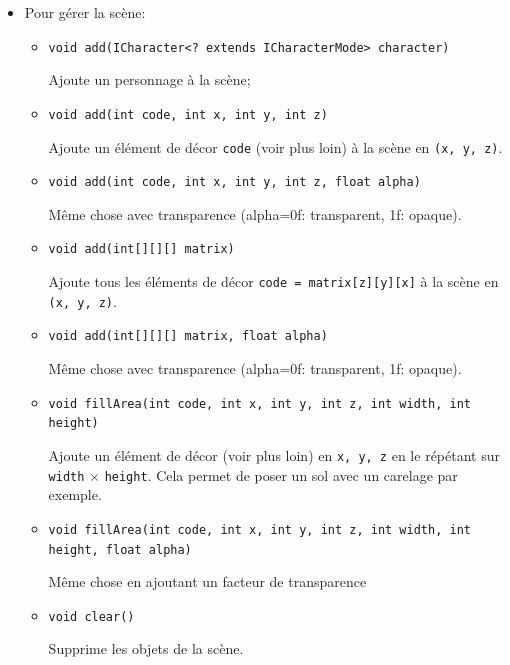 \documentclass{article}
\newcommand{\code}[1]{\lstinline{#1}}
\begin{document}
\begin{itemize}
    \item Pour gérer la scène:
    \begin{itemize}

        \item \code{void add(ICharacter<? extends ICharacterMode> character)}
        
            Ajoute un personnage à la scène;

        \item \code{void add(int code, int x, int y, int z)}

            Ajoute un élément de décor \code{code} (voir plus loin) à la scène en \code{(x, y, z)}.

        \item \code{void add(int code, int x, int y, int z, float alpha)}
        
            Même chose avec transparence (alpha=0f: transparent, 1f: opaque).

        \item \code{void add(int[][][] matrix)}
        
            Ajoute tous les éléments de décor \code{code = matrix[z][y][x]} à la scène en \\\code{(x, y, z)}.

        \item \code{void add(int[][][] matrix, float alpha)}
    
            Même chose avec transparence (alpha=0f: transparent, 1f: opaque).

        \item \code{void fillArea(int code, int x, int y, int z, int width, int height)}

            Ajoute un élément de décor (voir plus loin) en \code{x, y, z} en le répétant sur 
            \code{width} $\times$ \code{height}.
            Cela permet de poser un sol avec un carelage par exemple.

        \item \code{void fillArea(int code, int x, int y, int z, int width, int height, float alpha)}

            Même chose en ajoutant un facteur de transparence 
            


        \item \code{void clear()}
        
            Supprime les objets de la scène.


\end{itemize}
\end{itemize}
\end{document}
